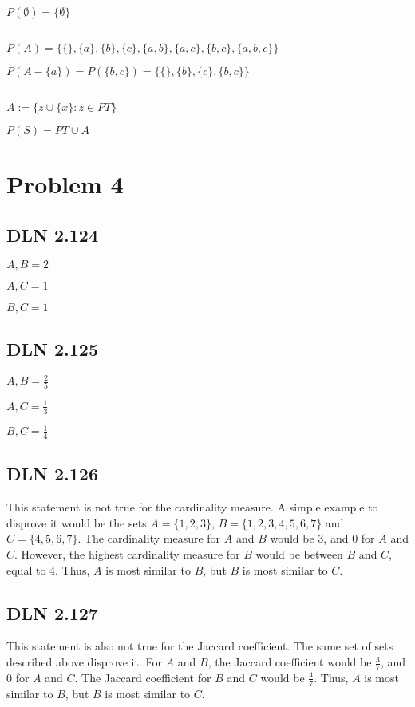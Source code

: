 \documentclass[titlepage]{article}
\begin{document}
\(P(\emptyset) = \{\emptyset\}\)

\subsection{}
\(P(A) = \{\{\},\{a\},\{b\},\{c\},\{a,b\},\{a,c\},\{b,c\},\{a,b,c\}\}\)

\(P(A -\{a\}) = P(\{b,c\}) = \{\{\},\{b\},\{c\},\{b,c\}\}\)

\subsection{}
\(A:= \{z \cup \{x\} : z \in PT\}\)

\(P(S)= PT \cup A\)

\section{Problem 4}

\subsection{DLN 2.124}

\(A,B = 2\)

\(A,C = 1\)

\(B,C = 1\)

\subsection{DLN 2.125}

\(A,B = \frac{2}{5}\)

\(A,C = \frac{1}{3}\)

\(B,C = \frac{1}{4}\)

\subsection{DLN 2.126}

This statement is not true for the cardinality measure. A simple example to disprove it would be the sets \(A = \{1,2,3\}\), \(B = \{1,2,3,4,5,6,7\}\) and \(C = \{4,5,6,7\}\). The cardinality measure for $A$ and $B$ would be $3$, and $0$ for $A$ and $C$. However, the highest cardinality measure for $B$ would be between $B$ and $C$, equal to $4$. Thus, $A$ is most similar to $B$, but $B$ is most similar to $C$.

\subsection{DLN 2.127}

This statement is also not true for the Jaccard coefficient. The same set of sets described above disprove it. For $A$ and $B$, the Jaccard coefficient would be \(\frac{3}{7}\), and \(0\) for $A$ and $C$. The Jaccard coefficient for $B$ and $C$ would be \(\frac{4}{7}\). Thus, $A$ is most similar to $B$, but $B$ is most similar to $C$.
\end{document}
